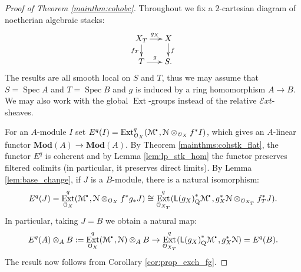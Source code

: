 \documentclass{amsart}
\theoremstyle{plain}
\theoremstyle{definition}
\theoremstyle{remark}
\numberwithin{equation}{section}
\newcommand{\Orb}{\mathcal{O}}
\DeclareMathOperator{\spec}{Spec}
\newcommand{\MOD}[1]{\mathbf{Mod}({#1})}
\DeclareMathOperator{\Ext}{Ext}
\newcommand{\LDERF}{\mathsf{L}}
\newcommand{\tensor}{\otimes}
\newcommand{\shv}[1]{\mathcal{{#1}}}
\newcommand{\SExt}{\mathcal{E}xt}
\newcommand{\QCPBK}[1]{{#1}_{\mathrm{Q}}^*}
\newcommand{\sbt}{\,\begin{picture}(-1,-1)(0,-2)\circle*{1.5}\end{picture}\ }
\newcommand{\cplx}[1]{\shv{{#1}}^{\sbt}}
\begin{document}
\begin{proof}[Proof of Theorem \ref{mainthm:cohobc}]
  Throughout we fix a $2$-cartesian diagram of noetherian algebraic
  stacks:
  \[
  \xymatrix@-0.8pc{X_T \ar[r]^{g_X} \ar[d]_{f_T} & X \ar[d]^f \\ T
    \ar[r]^g & S.}
  \]
  The results are all smooth local on $S$ and $T$, thus we may assume
  that $S=\spec A$ and $T=\spec B$ and $g$ is induced by a ring
  homomorphism $A \to B$. We may also work with the global
  $\Ext$-groups instead of the relative $\SExt$-sheaves. 

  For an $A$-module $I$ set $E^q(I) =
  \Ext^q_{\Orb_X}(\cplx{M},\shv{N}\tensor_{\Orb_X} f^*I)$, which gives
  an $A$-linear functor $\MOD{A} \to \MOD{A}$. By Theorem
  \ref{mainthms:cohstk_flat}, the functor $E^q$ is coherent and by
  Lemma \ref{lem:lp_stk_hom} the functor preserves filtered colimits
  (in particular, it preserves direct limits). By Lemma
  \ref{lem:base_change}, if $J$ is a $B$-module, there is a natural
  isomorphism:
  \[
  E^q(J) = \Ext^q_{\Orb_X}(\cplx{M},\shv{N} \tensor_{\Orb_X} f^*g_*J)
  \cong \Ext^q_{\Orb_{X_T}}(\LDERF \QCPBK{(g_X)}\cplx{M}, g_X^*\shv{N}
  \tensor_{\Orb_{X_T}} f_T^*J).
  \]
  In particular, taking $J=B$ we obtain a natural map:
  \[
  E^q(A)\tensor_A B := \Ext^q_{\Orb_X}(\cplx{M},\shv{N})\tensor_A B
  \to \Ext^q_{\Orb_{X_T}}(\LDERF \QCPBK{(g_X)}\cplx{M}, g_X^*\shv{N})
  = E^q(B).   
  \]
  The result now follows from Corollary \ref{cor:prop_exch_fg}. 
\end{proof}


\end{document}
